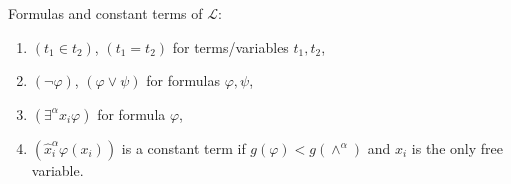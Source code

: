Formulas and constant terms of $\mathcal{L}$:
\begin{enumerate}
\item $(t_1 \in t_2)$, $(t_1 = t_2)$ for terms/variables $t_1, t_2$,
\item $(\neg \varphi)$, $(\varphi \lor \psi)$ for formulas $\varphi, \psi$,
\item $(\exists^\alpha x_i \varphi)$ for formula $\varphi$,
\item $(\hat{x}_i^\alpha \varphi(x_i))$ is a constant term if $g(\varphi) < g(\wedge^\alpha)$ and $x_i$ is the only free variable.
\end{enumerate}
